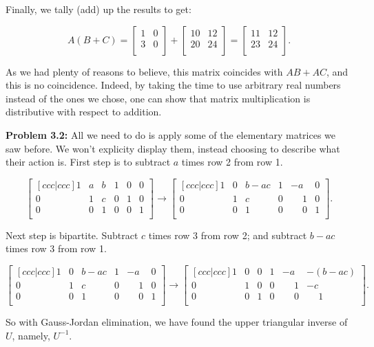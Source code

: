 \documentclass{article}
\begin{document}
Finally, we tally (add) up the results to get:

\[
A(B + C) = \begin{bmatrix}
1 & 0\\
3 & 0\\
\end{bmatrix}
+
\begin{bmatrix}
10 & 12\\
20 & 24\\
\end{bmatrix}
=
\begin{bmatrix}
11 & 12\\
23 & 24\\
\end{bmatrix}.
\]

As we had plenty of reasons to believe, this matrix coincides with $AB + AC$, and this is no coincidence. Indeed, by taking the time to use arbitrary real numbers instead of the ones we chose, one can show that matrix multiplication is distributive with respect to addition.

\noindent \textbf{Problem 3.2:} All we need to do is apply some of the elementary matrices we saw before. We won't explicity display them, instead choosing to describe what their action is. First step is to subtract $a$ times row 2 from row 1.

\[
\begin{bmatrix}[ccc|ccc]
1 & a & b & 1 & 0 & 0\\
0 & 1 & c & 0 & 1 & 0\\
0 & 0 & 1 & 0 & 0 & 1\\
\end{bmatrix}
\to
\begin{bmatrix}[ccc|ccc]
1 & 0 & b - ac & 1 & -a & 0\\
0 & 1 & c & 0 & \phantom{-}1 & 0\\
0 & 0 & 1 & 0 & \phantom{-}0 & 1\\
\end{bmatrix}.
\]

Next step is bipartite. Subtract $c$ times row 3 from row 2; and subtract $b - ac$ times row 3 from row 1.

\[
\begin{bmatrix}[ccc|ccc]
1 & 0 & b - ac & 1 & -a & 0\\
0 & 1 & c & 0 & \phantom{-}1 & 0\\
0 & 0 & 1 & 0 & \phantom{-}0 & 1\\
\end{bmatrix}
\to
\begin{bmatrix}[ccc|ccc]
1 & 0 & 0 & 1 & -a & - (b - ac)\\
0 & 1 & 0 & 0 & \phantom{-}1 & -c\\
0 & 0 & 1 & 0 & \phantom{-}0 & \phantom{-}1\\
\end{bmatrix}.
\]

So with Gauss-Jordan elimination, we have found the upper triangular inverse of $U$, namely, $U^{-1}$.
\end{document}
